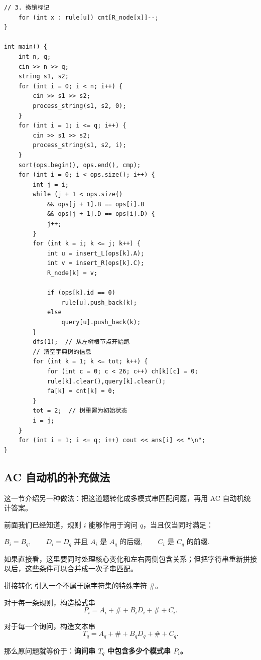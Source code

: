 \documentclass{book}
\begin{document}
\begin{lstlisting}[style = code]
    // 3. 撤销标记
    for (int x : rule[u]) cnt[R_node[x]]--;
}

int main() {
    int n, q;
    cin >> n >> q;
    string s1, s2;
    for (int i = 0; i < n; i++) {
        cin >> s1 >> s2;
        process_string(s1, s2, 0);
    }
    for (int i = 1; i <= q; i++) {
        cin >> s1 >> s2;
        process_string(s1, s2, i);
    }
    sort(ops.begin(), ops.end(), cmp);
    for (int i = 0; i < ops.size(); i++) {
        int j = i;
        while (j + 1 < ops.size()
            && ops[j + 1].B == ops[i].B
            && ops[j + 1].D == ops[i].D) {
            j++;
        }
        for (int k = i; k <= j; k++) {
            int u = insert_L(ops[k].A);
            int v = insert_R(ops[k].C);
            R_node[k] = v;

            if (ops[k].id == 0)
                rule[u].push_back(k);
            else
                query[u].push_back(k);
        }
        dfs(1);  // 从左树根节点开始跑
        // 清空字典树的信息
        for (int k = 1; k <= tot; k++) {
            for (int c = 0; c < 26; c++) ch[k][c] = 0;
            rule[k].clear(),query[k].clear();
            fa[k] = cnt[k] = 0;
        }
        tot = 2;  // 树重置为初始状态
        i = j;
    }
    for (int i = 1; i <= q; i++) cout << ans[i] << "\n";
}
\end{lstlisting}

\newpage
\subsection{AC 自动机的补充做法}

这一节介绍另一种做法：把这道题转化成多模式串匹配问题，再用 AC 自动机统计答案。

前面我们已经知道，规则 $i$ 能够作用于询问 $q$，当且仅当同时满足：

$
B_i=B_q,\qquad D_i=D_q$
并且
$
A_i \text{ 是 } A_q \text{ 的后缀},\qquad
C_i \text{ 是 } C_q \text{ 的前缀}.
$

如果直接看，这里要同时处理核心变化和左右两侧包含关系；但把字符串重新拼接以后，这些条件可以合并成一次子串匹配。

\begin{keybox}{拼接转化}
引入一个不属于原字符集的特殊字符 $\mathtt{\#}$。

对于每一条规则，构造模式串
\[
P_i=A_i+\mathtt{\#}+B_iD_i+\mathtt{\#}+C_i.
\]

对于每一个询问，构造文本串
\[
T_q=A_q+\mathtt{\#}+B_qD_q+\mathtt{\#}+C_q.
\]

那么原问题就等价于：\textbf{询问串 $T_q$ 中包含多少个模式串 $P_i$。}
\end{keybox}
\end{document}
